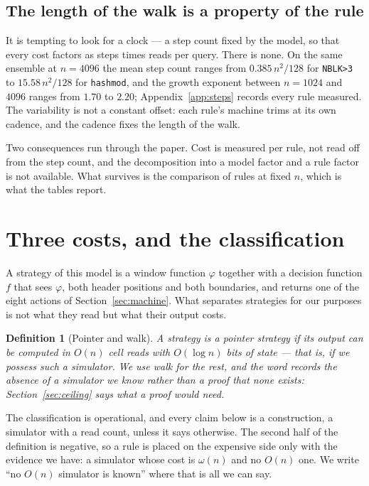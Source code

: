 \documentclass[11pt]{article}
\newtheorem{definition}{Definition}
\theoremstyle{remark}
\begin{document}
\subsection{The length of the walk is a property of the rule}

It is tempting to look for a clock --- a step count fixed by the model, so that every cost factors as
steps times reads per query. There is none. On the same ensemble at $n=4096$ the mean step count ranges
from $0.385\,n^{2}/128$ for \texttt{NBLK>3} to $15.58\,n^{2}/128$ for \texttt{hashmod}, and the growth
exponent between $n=1024$ and $4096$ ranges from $1.70$ to $2.20$; Appendix~\ref{app:steps} records
every rule measured. The variability is not a constant offset: each rule's machine trims at its own
cadence, and the cadence fixes the length of the walk.

Two consequences run through the paper. Cost is measured per rule, not read off from the step count,
and the decomposition into a model factor and a rule factor is not available. What survives is the
comparison of rules at fixed $n$, which is what the tables report.

\section{Three costs, and the classification}\label{sec:classes}

A strategy of this model is a window function $\varphi$ together with a decision function $f$ that
sees $\varphi$, both header positions and both boundaries, and returns one of the eight actions of
Section~\ref{sec:machine}. What separates strategies for our purposes is not what they read but what
their output costs.

\begin{definition}[Pointer and walk]
A strategy is a \emph{pointer} strategy if its output can be computed in $O(n)$ cell reads with
$O(\log n)$ bits of state --- that is, if we possess such a simulator. We use \emph{walk} for the
rest, and the word records the absence of a simulator we know rather than a proof that none exists:
Section~\ref{sec:ceiling} says what a proof would need.
\end{definition}

The classification is operational, and every claim below is a construction, a simulator with a read
count, unless it says otherwise. The second half of the definition is negative, so a rule is placed
on the expensive side only with the evidence we have: a simulator whose cost is $\omega(n)$ and no
$O(n)$ one. We write ``no $O(n)$ simulator is known'' where that is all we can say.
\end{document}
